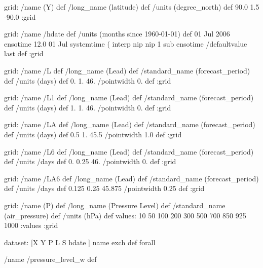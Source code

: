 \begin{ingrid}
{grid:
/name (Y) def
/long_name (latitude) def
/units (degree_north) def
90.0 1.5 -90.0
:grid

grid:
/name /hdate def
/units (months since 1960-01-01) def
01 Jul 2006 ensotime
12.0
01 Jul 
systemtime
   (%
    interp nip nip
    1 sub
ensotime
/defaultvalue { last } def
:grid

grid:
/name /L def
/long_name (Lead) def
/standard_name (forecast_period) def
/units (days) def
0. 1. 46.
/pointwidth 0. def
:grid

grid:
/name /L1 def
/long_name (Lead) def
/standard_name (forecast_period) def
/units (days) def
1. 1. 46.
/pointwidth 0. def
:grid

grid:
/name /LA def
/long_name (Lead) def
/standard_name (forecast_period) def
/units (days) def
0.5 1. 45.5
/pointwidth 1.0 def
:grid

 grid:
 /name /L6 def
 /long_name (Lead) def
 /standard_name (forecast_period) def
 /units /days def
 0. 0.25 46.
 /pointwidth 0. def
 :grid
 
 grid:
 /name /LA6 def
 /long_name (Lead) def
 /standard_name (forecast_period) def
 /units /days def
 0.125 0.25 45.875
 /pointwidth 0.25 def
 :grid

grid:
/name (P) def
/long_name (Pressure Level) def
/standard_name (air_pressure) def
/units (hPa) def
values: 10 50 100 200 300 500 700 850 925 1000 :values
:grid


dataset:
[X Y P L S hdate ] {name exch def } forall

/name /pressure_level_w def

}
\end{ingrid}
